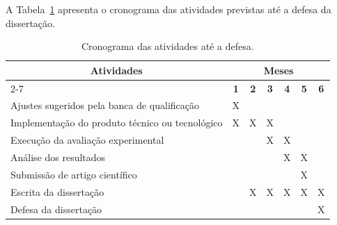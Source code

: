 
A Tabela~\ref{tab:cronograma} apresenta o cronograma das atividades previstas até a defesa da dissertação.

\begin{table}[htbp]
  \centering
  \begin{tabular}{|l|c|c|c|c|c|c|}
    \hline
    \multicolumn{1}{|c|}{\multirow{2}{*}{\textbf{Atividades}}} & \multicolumn{6}{c|}{\textbf{Meses}} \bigstrut\\
    \cline{2-7}
    & \textbf{1} & \textbf{2} & \textbf{3} & \textbf{4} & \textbf{5} & \textbf{6} \bigstrut\\
    \hline
    Ajustes sugeridos pela banca de qualificação & X &  &  &  &  &  \bigstrut\\
    \hline
    Implementação do produto técnico ou tecnológico & X & X & X &  &  &  \bigstrut\\
    \hline
    Execução da avaliação experimental &  &  & X & X &  &  \bigstrut\\
    \hline
    Análise dos resultados &  &  &  & X & X &  \bigstrut\\
    \hline
    Submissão de artigo científico &  &  &  &  & X &  \bigstrut\\
    \hline
    Escrita da dissertação &  & X & X & X & X & X \bigstrut\\
    \hline
    Defesa da dissertação &  &  &  &  &  & X \bigstrut\\
    \hline
  \end{tabular}
  \caption{Cronograma das atividades até a defesa.}
  \label{tab:cronograma}
\end{table}
